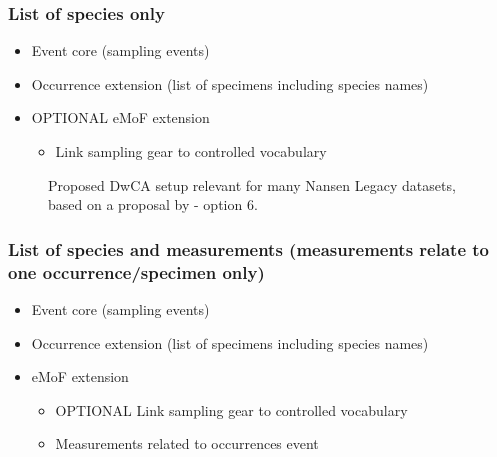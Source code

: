 \documentclass[a4paper,english, 11pt]{article}
\begin{document}
\subsubsection{List of species only}
\label{ss:listspeciesonly}

\begin{itemize}
\item Event core (sampling events)
\item Occurrence extension (list of specimens including species names)
\item OPTIONAL eMoF extension
\begin{itemize}
\item Link sampling gear to controlled vocabulary
\end{itemize}
\end{itemize}

\begin{figure}[h!tb]
    \caption{\label{fig:dwca_aen_eg1}
        Proposed DwCA setup relevant for many Nansen Legacy datasets, based on a proposal by \cite{de2017toward} - option 6.
    }
\end{figure}

\subsubsection{List of species and measurements (measurements relate to one occurrence/specimen only)}
\label{ss:speciesmeasurementsoneoccurrence}

\begin{itemize}
\item Event core (sampling events)
\item Occurrence extension (list of specimens including species names)
\item eMoF extension
\begin{itemize}
\item OPTIONAL Link sampling gear to controlled vocabulary
\item Measurements related to occurrences event
\end{itemize}
\end{itemize}
\end{document}
